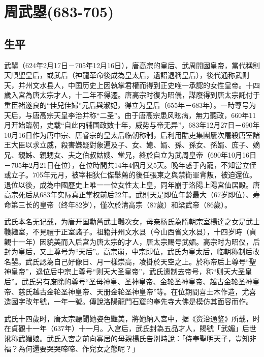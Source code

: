 
\section{周武曌\tiny(683-705)}

\subsection{生平}

武曌（624年2月17日－705年12月16日），唐高宗的皇后、武周開國皇帝，當代稱則天順聖皇后，或武后（神龍革命後成為皇太后，遺詔退稱皇后），後代通称武则天，并州文水县人，中国历史上因執掌君權而得到正史唯一承認的女性皇帝。十四歲入宮為唐太宗才人，十二年不得遷。唐高宗时復为昭儀，謀廢得到唐太宗託付于重臣褚遂良的“佳兒佳婦”元后與淑妃，得立为皇后（655年－683年）。一時尊号为天后，与唐高宗天皇李治并称“二圣”。由于唐高宗患风眩病，無力聽政，660年11月开始臨朝，史载“自此内辅国政数十年，威势与帝无异”，683年12月27日－690年10月16日作为唐中宗、唐睿宗的皇太后临朝称制，后利用酷吏集團屢次屠殺唐室諸王大臣以求立威，殺害嫌疑對象遍及子、女、媳、婿、孫、孫女、孫婿、庶子、嫡兄、親姊、親甥女、夫之伯叔姑嫂、堂兄，終於自立为武周皇帝（690年10月16日－705年2月21日在位），在位時間共14年4個月又5天。晚年惑于內寵，不知當立侄或立子。705年元月，被宰相狄仁傑舉薦的後任張柬之與禁衛軍背叛，被迫還位。退位以後，成為中國歷史上唯一一位女性太上皇，同年崩于洛陽上陽宮仙居殿。唐高宗死后从683年实际真正掌权前后22年。武則天是即位年龄最大（67岁即位）、寿命第三长的皇帝（终年82岁），僅次於清高宗（87歲）和梁武帝（86歲）。

武氏本名无记载，为唐开国勳舊武士彠次女，母亲杨氏為隋朝宗室楊達之女是武士彠繼室，不見禮于正室諸子。祖籍并州文水县（今山西省文水县），十四岁時（貞觀十一年）因貌美而入后宫为唐太宗的才人，唐太宗赐号武媚。高宗时为昭仪，后封为皇后，又上尊号为“天后”。高宗崩，中宗即位，武氏为皇太后，临朝称制后改名曌。武氏認為自己好像日、月一樣崇高，凌掛於天空之上。於称帝后上尊号“聖神皇帝”，退位后中宗上尊号“则天大圣皇帝”，武氏遗制去帝号，称“则天大圣皇后”。武氏另有废除的尊号“圣母神皇、圣神皇帝、金轮圣神皇帝、越古金轮圣神皇帝、慈氏越古金轮圣神皇帝、天册金轮圣神皇帝”等。在位期間喜土木作造，尤喜造國字改年號，一年一號。傳說洛陽龍門石窟的奉先寺大佛是模仿其面容而作。

武氏十四歲时，唐太宗聽聞她姿色豔美，將她納入宮中，据《资治通鉴》所载，时在貞觀十一年（637年）十一月。入宫后，武氏封為五品才人，賜號「武媚」后世讹称武媚娘。武氏入宮之前向寡居的母親楊氏告別時說：「侍奉聖明天子，豈知非福？為何還要哭哭啼啼、作兒女之態呢？」

